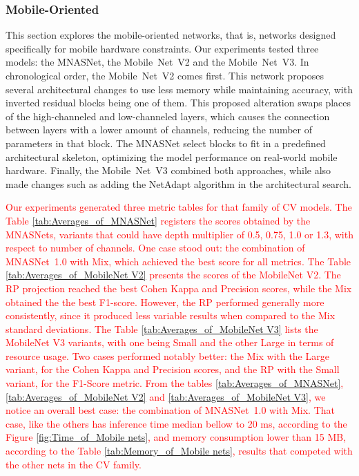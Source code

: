 




\FloatBarrier

\subsubsection{Mobile-Oriented}

This section explores the mobile-oriented networks, that is, networks designed specifically for mobile hardware constraints. Our experiments tested three models: the MNASNet, the \mbox{Mobile Net V2} and the \mbox{Mobile Net V3}. In chronological order, the \mbox{Mobile Net V2} comes first. This network proposes several architectural changes to use less memory while maintaining accuracy, with inverted residual blocks being one of them. This proposed alteration swaps places of the high-channeled and low-channeled layers, which causes the connection between layers with a lower amount of channels, reducing the number of parameters in that block. The MNASNet select blocks to fit in a predefined architectural skeleton, optimizing the model performance on real-world mobile hardware. Finally, the \mbox{Mobile Net V3} combined both approaches, while also made changes such as adding the NetAdapt \cite{NetAdapt} algorithm in the architectural search.

\textcolor{red}{
Our experiments generated three metric tables for that family of \gls{CV} models.
The Table \ref{tab:Averages_of_MNASNet} registers the scores obtained by the MNASNets, variants that could have depth multiplier of 0.5, 0.75, 1.0 or 1.3, with respect to number of channels. One case stood out: the combination of \mbox{MNASNet 1.0} with \gls{Mix}, which achieved the best score for all metrics.
The Table \ref{tab:Averages_of_MobileNet V2} presents the scores of the MobileNet V2. The \gls{RP} projection reached the best Cohen Kappa and Precision scores, while the \gls{Mix} obtained the the best F1-score. However, the \gls{RP} performed generally more consistently, since it produced less variable results when compared to the \gls{Mix} standard deviations. 
The Table \ref{tab:Averages_of_MobileNet V3} lists the MobileNet V3 variants, with one being Small and the other Large in terms of resource usage. Two cases performed notably better: the \gls{Mix} with the Large variant, for the Cohen Kappa and Precision scores, and the \gls{RP} with the Small variant, for the F1-Score metric.
From the tables \ref{tab:Averages_of_MNASNet}, \ref{tab:Averages_of_MobileNet V2} and \ref{tab:Averages_of_MobileNet V3}, we notice an overall best case: the combination of \mbox{MNASNet 1.0} with \gls{Mix}. That case, like the others has inference time median bellow to 20 ms, according to the Figure \ref{fig:Time_of_Mobile nets}, and memory consumption lower than 15 MB, according to the Table \ref{tab:Memory_of_Mobile nets}, results that competed with the other nets in the \gls{CV} family.
}

